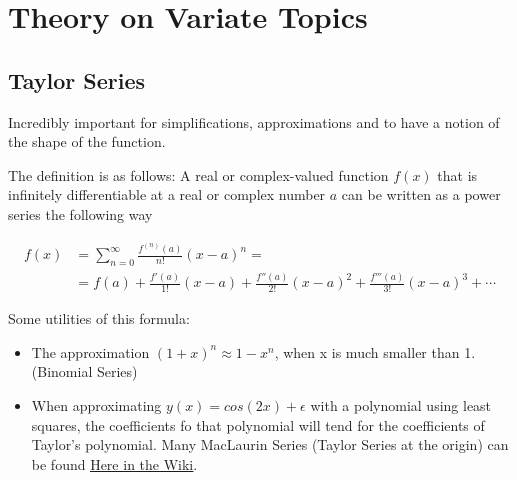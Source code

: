 

\section{Theory on Variate Topics}

\subsection{Taylor Series}
Incredibly important for simplifications, approximations and to have a notion of the shape of the function.

The definition is as follows:
A real or complex-valued function $f(x)$ that is infinitely differentiable at a real or complex number $a$ can be written as a power series the following way

\begin{align*}
    f(x) &= \sum_{n = 0}^{\infty} \frac{f^{(n)}(a)}{n!} (x-a)^n = \\
    &= f(a)+{\frac {f'(a)}{1!}}(x-a)+{\frac {f''(a)}{2!}}(x-a)^{2}+{\frac {f'''(a)}{3!}}(x-a)^{3}+\cdots
\end{align*}

Some utilities of this formula:
\begin{itemize}
    \item The approximation $(1+x)^n \approx 1-x^n$, when x is much smaller than 1. (Binomial Series)
    \item When approximating $y(x) = cos(2x) + \epsilon$ with a polynomial using least squares, the coefficients fo that polynomial will tend for the coefficients of Taylor's polynomial. Many MacLaurin Series (Taylor Series at the origin) can be found \href{https://en.wikipedia.org/wiki/Taylor_series#List_of_Maclaurin_series_of_some_common_functions}{\ul{Here in the Wiki}}.
\end{itemize}

